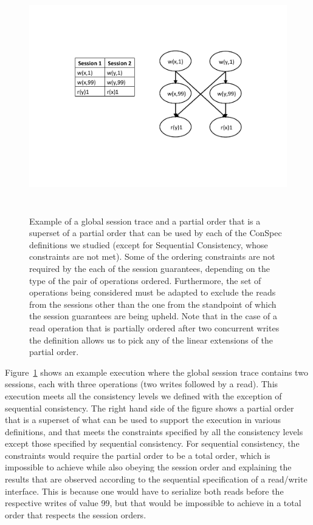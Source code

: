 \documentclass[acmlarge, ,11pt]{acmart}
\begin{document}
\begin{figure}[t]
        \begin{center}
        \includegraphics[width=6in,height=4in]
                    {examplepo} \vspace{-5em}
          \end{center}
        \caption{Example of a global session trace and a partial order that is a superset of a partial order that can be used by each of the ConSpec definitions we studied (except for Sequential Consistency, whose constraints are not met). Some of the ordering constraints are not required by the each of the session guarantees, depending on the type of the pair of operations ordered. Furthermore, the set of operations being considered must be adapted to exclude the reads from the sessions other than the one from the standpoint of which the session guarantees are being upheld. Note that in the case of a read operation that is partially ordered after two concurrent writes the definition allows us to pick any of the linear extensions of the partial order.}
        \label{fig:example}
\end{figure}

\par Figure~\ref{fig:example} shows an example execution where the global session trace contains two sessions, each with three operations (two writes followed by a read). This execution meets all the consistency levels we defined with the exception of sequential consistency. The right hand side of the figure shows a partial order that is a superset of what can be used to support the execution in various definitions, and that meets the constraints specified by all the consistency levels except those specified by sequential consistency. For sequential consistency, the constraints would require the partial order to be a total order, which is impossible to achieve while also obeying the session order and explaining the results that are observed according to the sequential specification of a read/write interface. This is because one would have to serialize both reads before the respective writes of value 99, but that would be impossible to achieve in a total order that respects the session orders.
\end{document}
